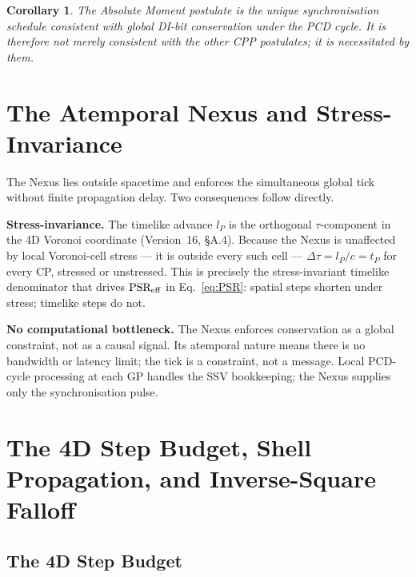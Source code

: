 \documentclass[12pt]{article}
\newtheorem{corollary}[theorem]{Corollary}
\begin{document}
\begin{corollary}
The Absolute Moment postulate is the unique synchronisation schedule
consistent with global DI-bit conservation under the PCD cycle.  It is
therefore not merely consistent with the other CPP postulates; it is
necessitated by them.
\end{corollary}

\section{The Atemporal Nexus and Stress-Invariance}
\label{sec:nexus}

The Nexus lies outside spacetime and enforces the simultaneous global tick
without finite propagation delay.  Two consequences follow directly.

\textbf{Stress-invariance.}  The timelike advance $l_P$ is the orthogonal
$\tau$-component in the 4D Voronoi coordinate (Version~16, \S A.4).  Because
the Nexus is unaffected by local Voronoi-cell stress --- it is outside every
such cell --- $\Delta\tau = l_P/c = t_P$ for every CP, stressed or unstressed.
This is precisely the stress-invariant timelike denominator that drives
$\text{PSR}_{\rm eff}$ in Eq.~\eqref{eq:PSR}: spatial steps shorten under
stress; timelike steps do not.

\textbf{No computational bottleneck.}  The Nexus enforces conservation as a
global constraint, not as a causal signal.  Its atemporal nature means there
is no bandwidth or latency limit; the tick is a constraint, not a message.
Local PCD-cycle processing at each GP handles the SSV bookkeeping; the Nexus
supplies only the synchronisation pulse.

\section{The 4D Step Budget, Shell Propagation, and Inverse-Square Falloff}
\label{sec:4d}

\subsection{The 4D Step Budget}
\end{document}
